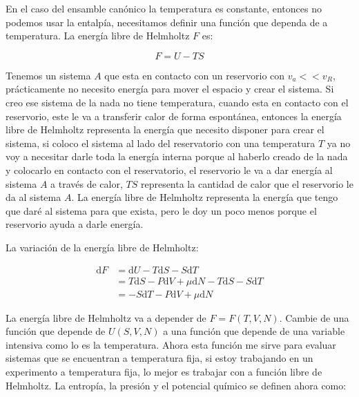 \documentclass[11pt,fleqn]{book}
\begin{document}
En el caso del ensamble canónico la temperatura es constante, entonces no podemos usar la entalpía, necesitamos definir una función que dependa de a temperatura. La energía libre de Helmholtz $F$ es:


\begin{equation}
        F=U-TS
    \label{Eq. 4.56}
\end{equation}

Tenemos un sistema $A$ que esta en contacto con un reservorio con $v_{a}<<v_{R}$, prácticamente no necesito energía para mover el espacio y crear el sistema. Si creo ese sistema de la nada no tiene temperatura, cuando esta en contacto con el reservorio, este le va a transferir calor de forma espontánea, entonces la energía libre de Helmholtz representa la energía que necesito disponer para crear el sistema, si coloco el sistema al lado del reservatorio con una temperatura $T$ ya no voy a necesitar darle toda la energía interna porque al haberlo creado de la nada y colocarlo en contacto con el reservatorio, el reservorio le va a dar energía al sistema $A$ a través de calor, $TS$ representa la cantidad de calor que el reservorio le da al sistema $A$. La energía libre de Helmholtz representa la energía que tengo que daré al sistema para que exista, pero le doy un poco menos porque el reservorio ayuda a darle energía.


La variación de la energía libre de Helmholtz:

\begin{equation}
\begin{split}
    \mathrm{d}F&=\mathrm{d}U-T\mathrm{d}S-S\mathrm{d}T\\
    &=T\mathrm{d}S-P\mathrm{d}V+\mu\mathrm{d}N-T\mathrm{d}S-S\mathrm{d}T\\
    &=-S\mathrm{d}T-P\mathrm{d}V+\mu\mathrm{d}N
\end{split}
    \label{Eq. 4.57}
\end{equation}

La energía libre de Helmholtz va a depender de $F=F(T, V, N)$. Cambie de una función que depende de $U(S, V, N)$ a una función que depende de una variable intensiva como lo es la temperatura. Ahora esta función me sirve para evaluar sistemas que se encuentran a temperatura fija, si estoy trabajando en un experimento a temperatura fija, lo mejor es trabajar con a función libre de Helmholtz.  La entropía, la presión y el potencial químico se definen ahora como:
\end{document}
